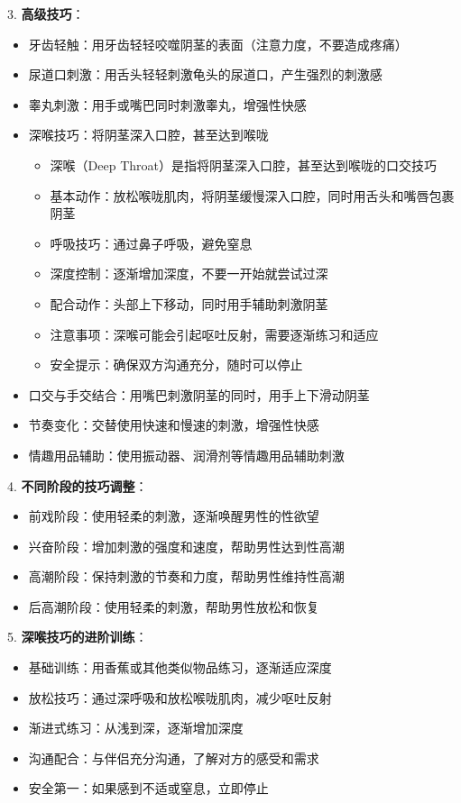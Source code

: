 \documentclass[12pt,UTF8]{ctexbook}
\begin{document}
3. \textbf{高级技巧}：
  \begin{itemize}
  \item 牙齿轻触：用牙齿轻轻咬噬阴茎的表面（注意力度，不要造成疼痛）
  \item 尿道口刺激：用舌头轻轻刺激龟头的尿道口，产生强烈的刺激感
  \item 睾丸刺激：用手或嘴巴同时刺激睾丸，增强性快感
  \item 深喉技巧：将阴茎深入口腔，甚至达到喉咙
    \begin{itemize}
    \item 深喉（Deep Throat）是指将阴茎深入口腔，甚至达到喉咙的口交技巧
    \item 基本动作：放松喉咙肌肉，将阴茎缓慢深入口腔，同时用舌头和嘴唇包裹阴茎
    \item 呼吸技巧：通过鼻子呼吸，避免窒息
    \item 深度控制：逐渐增加深度，不要一开始就尝试过深
    \item 配合动作：头部上下移动，同时用手辅助刺激阴茎
    \item 注意事项：深喉可能会引起呕吐反射，需要逐渐练习和适应
    \item 安全提示：确保双方沟通充分，随时可以停止
    \end{itemize}
  \item 口交与手交结合：用嘴巴刺激阴茎的同时，用手上下滑动阴茎
  \item 节奏变化：交替使用快速和慢速的刺激，增强性快感
  \item 情趣用品辅助：使用振动器、润滑剂等情趣用品辅助刺激
  \end{itemize}

4. \textbf{不同阶段的技巧调整}：
  \begin{itemize}
  \item 前戏阶段：使用轻柔的刺激，逐渐唤醒男性的性欲望
  \item 兴奋阶段：增加刺激的强度和速度，帮助男性达到性高潮
  \item 高潮阶段：保持刺激的节奏和力度，帮助男性维持性高潮
  \item 后高潮阶段：使用轻柔的刺激，帮助男性放松和恢复
  \end{itemize}

5. \textbf{深喉技巧的进阶训练}：
  \begin{itemize}
  \item 基础训练：用香蕉或其他类似物品练习，逐渐适应深度
  \item 放松技巧：通过深呼吸和放松喉咙肌肉，减少呕吐反射
  \item 渐进式练习：从浅到深，逐渐增加深度
  \item 沟通配合：与伴侣充分沟通，了解对方的感受和需求
  \item 安全第一：如果感到不适或窒息，立即停止
  \end{itemize}
\end{document}

